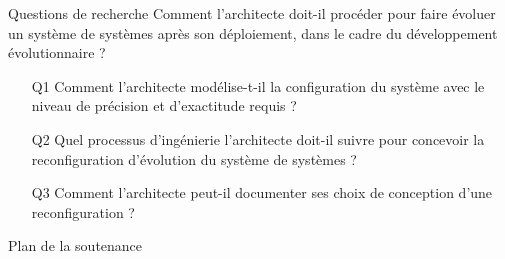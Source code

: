 

\begin{frame}{Questions de recherche}
Comment l’architecte doit-il procéder pour faire évoluer un système de systèmes après son déploiement, dans le cadre du développement évolutionnaire ?\\
\begin{itemize}
    \item[Q1] Comment l’architecte modélise-t-il la configuration du système avec le niveau de précision et d’exactitude requis ?
    \item[Q2] Quel processus d’ingénierie l’architecte doit-il suivre pour concevoir la reconfiguration d’évolution du système de systèmes ?
    \item[Q3] Comment l’architecte peut-il documenter ses choix de conception d’une reconfiguration ?
\end{itemize}
\end{frame}

\begin{frame}{Plan de la soutenance}
\tableofcontents
\end{frame}

